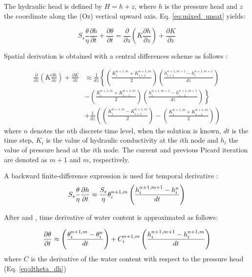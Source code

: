 \documentclass[a4paper,12pt]{article}
\begin{document}
The hydraulic head is defined by $H = h + z$, where $h$ is the pressure head and $z$ the coordinate along the (Oz) vertical upward axis. Eq. \ref{eq:mixed_unsat} yields: 

\begin{equation} \label{eq:mixed_unsat2}
    S_s \frac{\theta}{\eta} \frac{\partial h}{\partial t} + \frac{\partial \theta}{\partial t} =
	 \frac{\partial}{\partial z} \left( K \frac{\partial h}{\partial z} \right) + \frac{\partial K}{\partial z}
\end{equation}

Spatial derivation is obtained with a central differences scheme as follows : 

\begin{align} \label{eq:space_discret}
      \frac{\partial}{\partial z} \left( K \frac{\partial h}{\partial z} \right) + \frac{\partial K}{\partial z} & \approx  \frac{1}{dz} \left\{ \left(\frac{K_i^{n+1,m}+K_{i+1}^{n+1,m}}{2}\right) \left(\frac{h_{i+1}^{n+1,m+1} - h_i^{n+1,m+1}}{dz} \right) \right. \nonumber \\
      &  - \left. \left(\frac{K_i^{n+1,m}+K_{i-1}^{n+1,m}}{2}\right) \left(\frac{h_{i}^{n+1,m+1} - h_{i-1}^{n+1,m+1}}{dz} \right)  \right\} \nonumber  \\
      & + \frac{1}{dz} \left( \left(\frac{K_i^{n+1,m}-K_{i+1}^{n+1,m}}{2}\right) - \left(\frac{K_i^{n+1,m}+K_{i-1}^{n+1,m}}{2}  \right) \right)  
\end{align}
where $n$ denotes the $n$th discrete time level, when the solution is known, $dt$ is the time step, $K_i$ is the value of hydraulic conductivity at the $i$th node and $h_i$ the value of pressure head at the $i$th node. The current and previous Picard iteration are denoted as $m+1$ and $m$, respectively.

A backward finite-difference expression is used for temporal derivative : 
\begin{equation}  \label{eq:dh_temp_deriv}
    S_s \frac{\theta}{\eta} \frac{\partial h}{\partial t} \approx \frac{S_s}{\eta}\theta_i^{n+1,m} \left( { h_i^{n+1,m+1} - h_i^n \over dt} \right)
\end{equation}

After \cite{Celiaetal1990} and \cite{Clementetal1994}, time derivative of water content is approximated as follows:

\begin{equation} \label{eq:theta_temp_deriv}
    \frac{\partial \theta}{\partial t} \approx \left( {\theta_i^{n+1,m} - \theta_i^n \over dt} \right) + C_i^{n+1,m} \left( {h_i^{n+1,m+1}-h_i^{n+1,m} \over dt} \right)
\end{equation}
where $C$ is the derivative of the water content with respect to the pressure head (Eq. \ref{eq:dtheta_dh})
\end{document}
